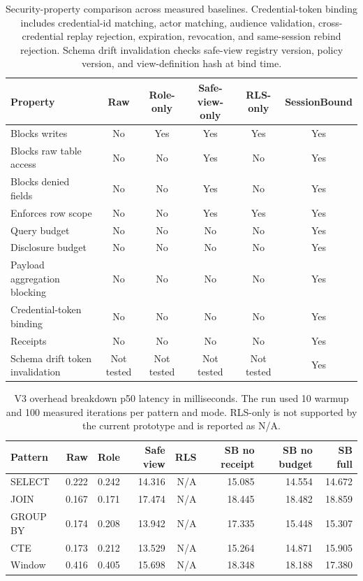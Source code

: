 \documentclass[journal]{IEEEtran}
\begin{document}
\begin{table}[!t]
\centering
\scriptsize
\setlength{\tabcolsep}{2.5pt}
\caption{Security-property comparison across measured baselines. Credential-token binding includes credential-id matching, actor matching, audience validation, cross-credential replay rejection, expiration, revocation, and same-session rebind rejection. Schema drift invalidation checks safe-view registry version, policy version, and view-definition hash at bind time.}
\label{tab:security-baselines}
\begin{tabular}{@{}lccccc@{}}
\toprule
Property & Raw & Role-only & Safe-view-only & RLS-only & SessionBound \\
\midrule
Blocks writes & No & Yes & Yes & Yes & Yes \\
Blocks raw table access & No & No & Yes & No & Yes \\
Blocks denied fields & No & No & Yes & No & Yes \\
Enforces row scope & No & No & Yes & Yes & Yes \\
Query budget & No & No & No & No & Yes \\
Disclosure budget & No & No & No & No & Yes \\
Payload aggregation blocking & No & No & No & No & Yes \\
Credential-token binding & No & No & No & No & Yes \\
Receipts & No & No & No & No & Yes \\
Schema drift token invalidation & Not tested & Not tested & Not tested & Not tested & Yes \\
\bottomrule
\end{tabular}
\end{table}

\begin{table}[!t]
\centering
\scriptsize
\setlength{\tabcolsep}{2.2pt}
\caption{V3 overhead breakdown p50 latency in milliseconds. The run used 10 warmup and 100 measured iterations per pattern and mode. RLS-only is not supported by the current prototype and is reported as N/A.}
\label{tab:performance}
\begin{tabular}{@{}lrrrrrrr@{}}
\toprule
Pattern & Raw & Role & Safe view & RLS & SB no receipt & SB no budget & SB full \\
\midrule
SELECT & 0.222 & 0.242 & 14.316 & N/A & 15.085 & 14.554 & 14.672 \\
JOIN & 0.167 & 0.171 & 17.474 & N/A & 18.445 & 18.482 & 18.859 \\
GROUP BY & 0.174 & 0.208 & 13.942 & N/A & 17.335 & 15.448 & 15.307 \\
CTE & 0.173 & 0.212 & 13.529 & N/A & 15.264 & 14.871 & 15.905 \\
Window & 0.416 & 0.405 & 15.698 & N/A & 18.348 & 18.188 & 17.380 \\
\bottomrule
\end{tabular}
\end{table}
\end{document}
